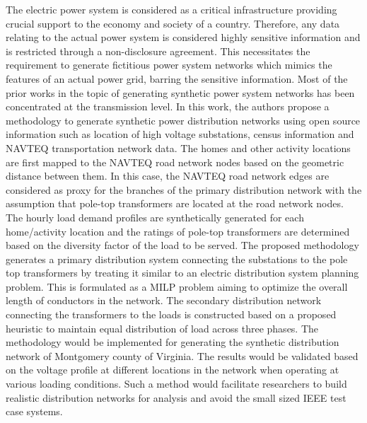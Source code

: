 \documentclass[a4paper]{article}
\begin{document}
\normalsize
The electric power system is considered as a critical infrastructure providing crucial support to the economy and society of a country. Therefore, any data relating to the actual power system is considered highly sensitive information and is restricted through a non-disclosure agreement. This necessitates the requirement to generate fictitious power system networks which mimics the features of an actual power grid, barring the sensitive information. Most of the prior works in the topic of generating synthetic power system networks has been concentrated at the transmission level. In this work, the authors propose a methodology to generate synthetic power distribution networks using open source information such as location of high voltage substations, census information and NAVTEQ transportation network data. The homes and other activity locations are first mapped to the NAVTEQ road network nodes based on the geometric distance between them. In this case, the NAVTEQ road network edges are considered as proxy for the branches of the primary distribution network with the assumption that pole-top transformers are located at the road network nodes. The hourly load demand profiles are synthetically generated for each home/activity location and the ratings of pole-top transformers are determined based on the diversity factor of the load to be served. The proposed methodology generates a primary distribution system connecting the substations to the pole top transformers by treating it similar to an electric distribution system planning problem. This is formulated as a MILP problem aiming to optimize the overall length of conductors in the network. The secondary distribution network connecting the transformers to the loads is constructed based on a proposed heuristic to maintain equal distribution of load across three phases. The methodology would be implemented for generating the synthetic distribution network of Montgomery county of Virginia. The results would be validated based on the voltage profile at different locations in the network when operating at various loading conditions. Such a method would facilitate researchers to build realistic distribution networks for analysis and avoid the small sized IEEE test case systems.
\end{document}
